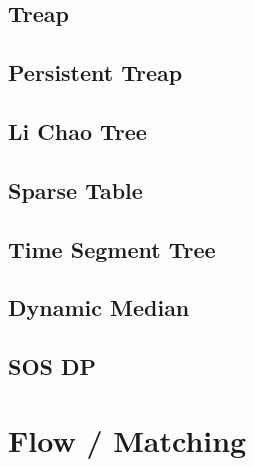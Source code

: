 \documentclass[a4paper,10pt,twocolumn,oneside,x11names]{article}
\begin{document}
\subsection{Treap}


\subsection{Persistent Treap}


\subsection{Li Chao Tree}


\subsection{Sparse Table}


\subsection{Time Segment Tree}


\subsection{Dynamic Median}


\subsection{SOS DP}






%

\section{Flow / Matching}
\end{document}
